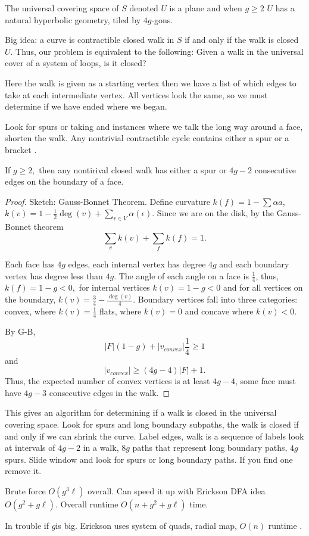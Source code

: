 The universal covering space of $S$ denoted $U$ is a plane
and when $g\geq 2$ $U$ has a natural hyperbolic geometry,
tiled by $4g$-gons.


Big idea: a curve is contractible closed walk in $S$
if and only if the walk is closed $U$.
Thus, our problem is equivalent to the following: Given a walk
in the universal cover of a system of loops, is it closed?

Here the walk is given as a starting vertex then we have a list of which
edges to take at each intermediate vertex. 
All vertices look the same, so we must determine if we have ended where
we began. 

Look for spurs or taking and instances where we talk the long way around a face, 
shorten the walk.
Any nontrivial contractible cycle contains either a spur or a bracket \cite{gertsen-short-1990}.
\begin{lemma}\label{lem:dehn}
If $g\geq 2,$ then any nontirival closed walk has either a spur
or $4g-2$ consecutive edges on the boundary of a face.
\end{lemma}
\begin{proof}
Sketch: Gauss-Bonnet Theorem.
Define curvature $k(f)=1-\sum \alpha{a}$,
$k(v)=1-\frac{1}{2}\deg(v)+\sum_{v\in V} \alpha(\epsilon)$.
Since we are on the disk, by the Gauss-Bonnet theorem
$$\sum_v k(v)+\sum_f k(f) =1.$$

Each face has $4g$ edges, each internal  vertex has degree $4g$
and each  boundary vertex  has degree less than $4g$.
The angle of each angle on a face  is $\frac{1}{4}$,
thus, $k(f)=1-g<0,$ for internal vertices  $k(v)=1-g<0$ and for all
vertices on the boundary, $k(v)=\frac{3}{4}-\frac{\deg(v)}{4}$.
Boundary vertices fall into three  categories: convex, where $k(v)=\frac{1}{4}$
flats,  where $k(v)=0$  and concave where $k(v)<0$.

By G-B, $$|F|(1-g)+|v_{convex}|\frac{1}{4}\geq 1$$
and 
$$|v_{convex}|\geq (4g-4)|F|+1.$$
Thus, the expected number of convex vertices is at least
$4g-4$, some face must have  $4g-3$ consecutive edges in the walk.
\end{proof}

This gives an algorithm for determining if a walk is closed in the universal
covering space.
Look for spurs and long boundary subpaths, the walk is closed if and  only if
we can  shrink the curve.
Label edges, walk is a sequence of labels
look at intervals of $4g-2$ in a walk, $8g$ paths
that represent long boundary paths, $4g$ spurs.
Slide window and look for spurs or long boundary paths.
If you find one remove it.

Brute force $O(g^3\ell)$ overall.
Can speed it up with Erickson DFA  idea
$O(g^2+g\ell)$.
Overall runtime $O(n+g^2+g\ell)$ time.

In trouble if $g$is big. Erickson uses system of quads,
radial map, $O(n)$ runtime  \cite{erickson-whittlesey-2013}.





